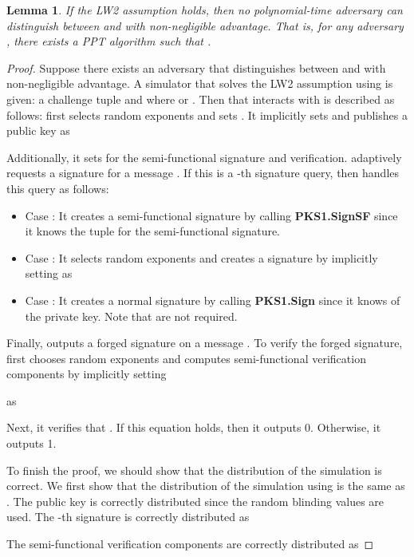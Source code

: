 \documentclass[11pt,letterpaper]{article}
\newcommand{\vs}{\vspace{1.5mm}}
\newtheorem{lemma}[theorem]{Lemma}
\begin{document}
\begin{lemma} \label{lem:pks1-prime-2}
If the LW2 assumption holds, then no polynomial-time adversary can
distinguish between  and  with non-negligible advantage.
That is, for any adversary , there exists a PPT algorithm 
such that
    .
\end{lemma}

\begin{proof}
Suppose there exists an adversary  that distinguishes between
 and  with non-negligible advantage. A
simulator  that solves the LW2 assumption using  is given:
a challenge tuple
     and 
where  or . Then  that
interacts with  is described as follows:  first selects
random exponents  and sets
    .
It implicitly sets  and
publishes a public key  as
    
Additionally, it sets  for the semi-functional
signature and verification.  adaptively requests a signature for a
message . If this is a -th signature query, then  handles
this query as follows:
\begin{itemize}
\item {Case } : It creates a semi-functional signature by calling
    \textbf{PKS1.SignSF} since it knows the tuple  for the semi-functional signature.

\item {Case } : It selects random exponents  and creates a signature by implicitly setting  as
    

\item {Case } : It creates a normal signature by calling
    \textbf{PKS1.Sign} since it knows  of the private key. Note
    that  are not required.
\end{itemize}

\noindent Finally,  outputs a forged signature  on a message . To verify the forged
signature,  first chooses random exponents 
and computes semi-functional verification components by implicitly setting
    
as
    
Next, it verifies that
    .
If this equation holds, then it outputs 0. Otherwise, it outputs 1.

\vs To finish the proof, we should show that the distribution of the
simulation is correct. We first show that the distribution of the simulation
using  is the same as . The public key is
correctly distributed since the random blinding values 
are used. The -th signature is correctly distributed as
    
The semi-functional verification components are correctly distributed as
    

\end{proof}
\end{document}
